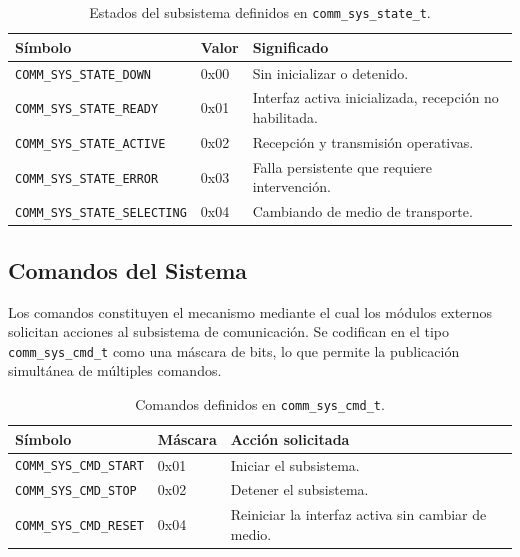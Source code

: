\begin{table}[htbp]
    \centering
    \caption{Estados del subsistema definidos en \texttt{comm\_sys\_state\_t}.}
    \label{tab:comm-sys-state}
    \begin{tabular}{llp{7cm}}
        \toprule
        \textbf{Símbolo} & \textbf{Valor} & \textbf{Significado} \\
        \midrule
        \texttt{COMM\_SYS\_STATE\_DOWN}      & 0x00 & Sin inicializar o detenido. \\
        \texttt{COMM\_SYS\_STATE\_READY}     & 0x01 & Interfaz activa inicializada, recepción no habilitada. \\
        \texttt{COMM\_SYS\_STATE\_ACTIVE}    & 0x02 & Recepción y transmisión operativas. \\
        \texttt{COMM\_SYS\_STATE\_ERROR}     & 0x03 & Falla persistente que requiere intervención. \\
        \texttt{COMM\_SYS\_STATE\_SELECTING} & 0x04 & Cambiando de medio de transporte. \\
        \bottomrule
    \end{tabular}
\end{table}

\subsection{Comandos del Sistema}
\label{subsec:sys-comandos}

Los comandos constituyen el mecanismo mediante el cual los módulos externos solicitan acciones al subsistema de comunicación. Se codifican en el tipo \texttt{comm\_sys\_cmd\_t} como una máscara de bits, lo que permite la publicación simultánea de múltiples comandos.

\begin{table}[htbp]
    \centering
    \caption{Comandos definidos en \texttt{comm\_sys\_cmd\_t}.}
    \label{tab:comm-sys-cmd}
    \begin{tabular}{llp{7cm}}
        \toprule
        \textbf{Símbolo} & \textbf{Máscara} & \textbf{Acción solicitada} \\
        \midrule
        \texttt{COMM\_SYS\_CMD\_START} & 0x01 & Iniciar el subsistema. \\
        \texttt{COMM\_SYS\_CMD\_STOP}  & 0x02 & Detener el subsistema. \\
        \texttt{COMM\_SYS\_CMD\_RESET} & 0x04 & Reiniciar la interfaz activa sin cambiar de medio. \\
        \bottomrule
    \end{tabular}
\end{table}


